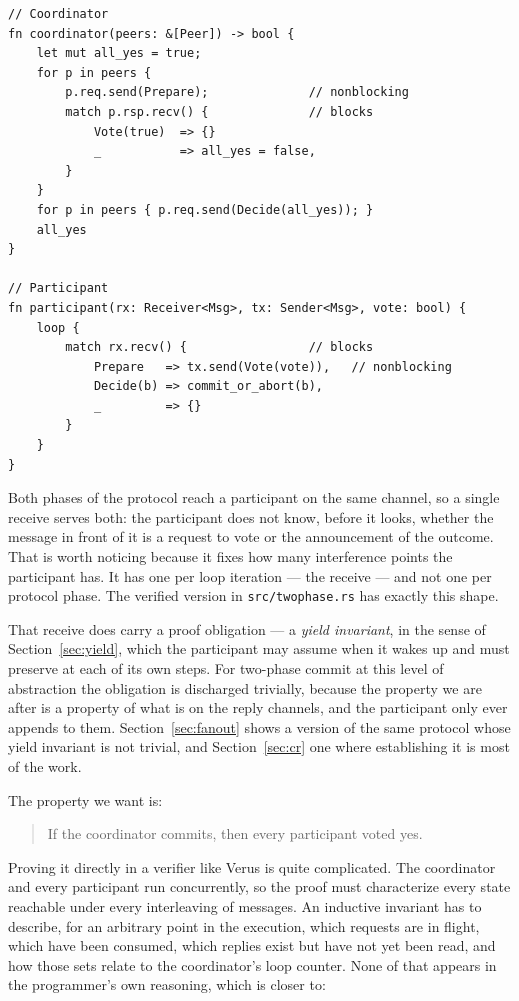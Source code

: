 \documentclass[11pt]{article}
\newcommand{\code}[1]{\texttt{#1}}
\newcommand{\srcname}[1]{%
  \vspace{0.9em}\noindent{\sffamily\scriptsize\color{comment}\MakeUppercase{#1}}\par
  \vspace{-0.7em}}
\begin{document}
\srcname{Two-phase commit in Rust, abridged}
\begin{lstlisting}
// Coordinator
fn coordinator(peers: &[Peer]) -> bool {
    let mut all_yes = true;
    for p in peers {
        p.req.send(Prepare);              // nonblocking
        match p.rsp.recv() {              // blocks
            Vote(true)  => {}
            _           => all_yes = false,
        }
    }
    for p in peers { p.req.send(Decide(all_yes)); }
    all_yes
}

// Participant
fn participant(rx: Receiver<Msg>, tx: Sender<Msg>, vote: bool) {
    loop {
        match rx.recv() {                 // blocks
            Prepare   => tx.send(Vote(vote)),   // nonblocking
            Decide(b) => commit_or_abort(b),
            _         => {}
        }
    }
}
\end{lstlisting}

Both phases of the protocol reach a participant on the same channel, so a single
receive serves both: the participant does not know, before it looks, whether the
message in front of it is a request to vote or the announcement of the outcome.
That is worth noticing because it fixes how many interference points the
participant has. It has one per loop iteration --- the receive --- and not one
per protocol phase. The verified version in \code{src/twophase.rs} has exactly
this shape.

That receive does carry a proof obligation --- a \emph{yield invariant}, in the
sense of Section~\ref{sec:yield}, which the participant may assume when it wakes
up and must preserve at each of its own steps. For two-phase commit at this
level of abstraction the obligation is discharged trivially, because the
property we are after is a property of what is on the reply channels, and the
participant only ever appends to them. Section~\ref{sec:fanout} shows a version
of the same protocol whose yield invariant is not trivial, and
Section~\ref{sec:cr} one where establishing it is most of the work.

The property we want is:

\begin{quote}
If the coordinator commits, then every participant voted yes.
\end{quote}

Proving it directly in a verifier like Verus is quite complicated.
The coordinator and every participant run concurrently, so the proof must characterize every
state reachable under every interleaving of messages. An inductive invariant has to
describe, for an arbitrary point in the execution, which requests are in flight,
which have been consumed, which replies exist but have not yet been read, and
how those sets relate to the coordinator's loop counter. None of that appears in
the programmer's own reasoning, which is closer to:
\end{document}
